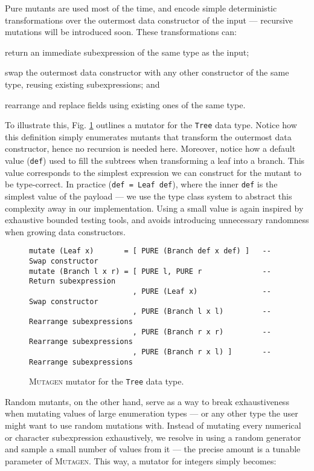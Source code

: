 \documentclass[sigconf, anonymous]{acmart}
\newcommand{\mutagen}{\textsc{Mutagen}\xspace}
\begin{document}
Pure mutants are used most of the time, and encode simple deterministic
transformations over the outermost data constructor of the input --- recursive
mutations will be introduced soon.
%
These transformations can:
%
\begin{inparaenum}
\item return an immediate subexpression of the same type as the input;
\item swap the outermost data constructor with any other constructor of the
  same type, reusing existing subexpressions; and
\item rearrange and replace fields using existing ones of the same type.
\end{inparaenum}
%
To illustrate this, Fig. \ref{fig:mutagen:mutator} outlines a mutator for the
\texttt{Tree} data type.
%
Notice how this definition simply enumerates mutants that transform the
outermost data constructor, hence no recursion is needed here.
%
Moreover, notice how a default value (\texttt{def}) used to fill the subtrees
when transforming a leaf into a branch.
%
This value corresponds to the simplest expression we can construct for the
mutant to be type-correct.
%
In practice (\texttt{def = Leaf def}), where the inner \texttt{def} is the
simplest value of the payload --- we use the type class system to abstract this
complexity away in our implementation.
%
Using a small value is again inspired by exhaustive bounded testing tools, and
avoids introducing unnecessary randomness when growing data constructors.

\begin{figure}
\begin{verbatim}
mutate (Leaf x)       = [ PURE (Branch def x def) ]   -- Swap constructor
mutate (Branch l x r) = [ PURE l, PURE r              -- Return subexpression
                        , PURE (Leaf x)               -- Swap constructor
                        , PURE (Branch l x l)         -- Rearrange subexpressions
                        , PURE (Branch r x r)         -- Rearrange subexpressions
                        , PURE (Branch r x l) ]       -- Rearrange subexpressions
\end{verbatim}
\vspace{-5pt}
\caption{\label{fig:mutagen:mutator}\mutagen mutator for the \texttt{Tree} data
  type.}
\vspace{-10pt}
\end{figure}

%
Random mutants, on the other hand, serve as a way to break exhaustiveness when
mutating values of large enumeration types --- or any other type the user might
want to use random mutations with.
%
Instead of mutating every numerical or character subexpression exhaustively, we
resolve in using a random generator and sample a small number of values from it
--- the precise amount is a tunable parameter of \mutagen.
%
This way, a mutator for integers simply becomes:
\end{document}
